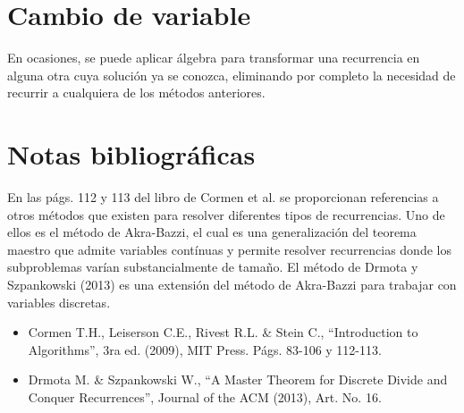 \section{Cambio de variable}

En ocasiones, se puede aplicar álgebra para transformar una recurrencia
en alguna otra cuya solución ya se conozca, eliminando por completo
la necesidad de recurrir a cualquiera de los métodos anteriores.

\section*{Notas bibliográficas}

En las págs. 112 y 113 del libro de Cormen et al. se proporcionan
referencias a otros métodos que existen para resolver diferentes tipos
de recurrencias. Uno de ellos es el método de Akra-Bazzi, el cual
es una generalización del teorema maestro que admite variables contínuas
y permite resolver recurrencias donde los subproblemas varían substancialmente
de tamaño. El método de Drmota y Szpankowski (2013) es una extensión
del método de Akra-Bazzi para trabajar con variables discretas. 
\begin{itemize}
\item Cormen T.H., Leiserson C.E., Rivest R.L. \& Stein C., ``Introduction
to Algorithms'', 3ra ed. (2009), MIT Press. Págs. 83-106 y 112-113.
\item Drmota M. \& Szpankowski W., ``A Master Theorem for Discrete Divide
and Conquer Recurrences'', Journal of the ACM (2013), Art. No. 16.
\end{itemize}

